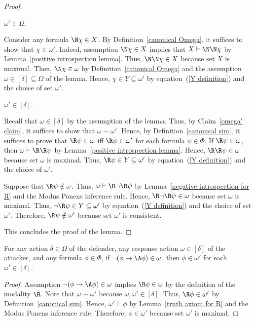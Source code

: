 \documentclass[letterpaper]{article}
\begin{document}
\begin{proof}
\begin{claim}\label{omega' claim}
$\omega'\in \Omega$.
\end{claim}
\begin{proof-of-claim}
Consider any formula $\N\chi\in X$. By Definition~\ref{canonical Omega}, it suffices to show that $\chi\in\omega'$. Indeed, assumption  $\N\chi\in X$ implies that $X\vdash\N\N\chi$ by Lemma~\ref{positive introspection lemma}. Thus, $\N\N\chi\in X$ because set $X$ is maximal. Then, $\N\chi\in\omega$ by Definition~\ref{canonical Omega} and the assumption $\omega\in[\delta]\subseteq\Omega$ of the lemma. Hence, $\chi\in Y\subseteq \omega'$ by equation~(\ref{Y definition}) and the choice of set $\omega'$.
\end{proof-of-claim}

\begin{claim}
$\omega'\in[\delta]$.
\end{claim}
\begin{proof-of-claim}
Recall that $\omega\in[\delta]$ by the assumption of the lemma. Thus, by Claim~\ref{omega' claim}, it suffices to show that $\omega\sim\omega'$.
Hence, by Definition~\ref{canonical sim}, it suffices to prove that $\R\psi\in \omega$ iff $\R\psi\in \omega'$ for each formula $\psi\in\Phi$. If $\R\psi\in \omega$, then $\omega\vdash\R\R\psi$ by Lemma~\ref{positive introspection lemma}. Hence, $\R\R\psi\in\omega$ because set $\omega$ is maximal.  Thus, $\R\psi\in Y\subseteq \omega'$ by equation~(\ref{Y definition}) and the choice of $\omega'$.

Suppose that $\R\psi\notin \omega$. Thus, $\omega\vdash \R\neg\R\psi$ by Lemma~\ref{negative introspection for R} and the Modus Ponens inference rule. Hence, $\R\neg\R\psi\in \omega$ because set $\omega$ is maximal.  Thus, $\neg\R\psi\in Y\subseteq \omega'$ by equation~(\ref{Y definition}) and the choice of set $\omega'$. Therefore, $\R\psi\notin \omega'$ because set $\omega'$ is consistent.
\end{proof-of-claim}
This concludes the proof of the lemma.
\end{proof}

\begin{lemma}\label{A child all}
For any action $\delta\in\Omega$ of the defender, any response action $\omega\in [\delta]$ of the attacker, and any formula $\phi\in\Phi$, if $\neg(\phi\to \A\phi)\in \omega$, then $\phi\in \omega'$ for each $\omega'\in[\delta]$.
\end{lemma}
\begin{proof}
Assumption $\neg(\phi\to \A\phi)\in \omega$ implies $\R\phi\in \omega$ by the definition of the modality $\R$. Note that $\omega\sim\omega'$ because $\omega,\omega'\in[\delta]$. Thus, $\R\phi\in \omega'$ by Definition~\ref{canonical sim}. Hence, $\omega'\vdash\phi$ by Lemma~\ref{truth axiom for R} and the Modus Ponens inference rule. Therefore, $\phi\in \omega'$ because set $\omega'$ is maximal.
\end{proof}
\end{document}
